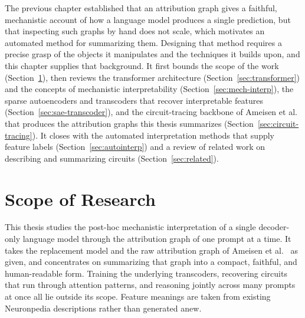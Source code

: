 \documentclass[../main.tex]{subfiles}
\begin{document}


The previous chapter established that an attribution graph gives a faithful, mechanistic account of how a language model produces a single prediction, but that inspecting such graphs by hand does not scale, which motivates an automated method for summarizing them. Designing that method requires a precise grasp of the objects it manipulates and the techniques it builds upon, and this chapter supplies that background. It first bounds the scope of the work (Section~\ref{sec:scope}), then reviews the transformer architecture (Section~\ref{sec:transformer}) and the concepts of mechanistic interpretability (Section~\ref{sec:mech-interp}), the sparse autoencoders and transcoders that recover interpretable features (Section~\ref{sec:sae-transcoder}), and the circuit-tracing backbone of Ameisen et al.~\cite{ameisen2025circuit} that produces the attribution graphs this thesis summarizes (Section~\ref{sec:circuit-tracing}). It closes with the automated interpretation methods that supply feature labels (Section~\ref{sec:autointerp}) and a review of related work on describing and summarizing circuits (Section~\ref{sec:related}).

\section{Scope of Research}
\label{sec:scope}
This thesis studies the post-hoc mechanistic interpretation of a single decoder-only language model through the attribution graph of one prompt at a time. It takes the replacement model and the raw attribution graph of Ameisen et al.~\cite{ameisen2025circuit} as given, and concentrates on summarizing that graph into a compact, faithful, and human-readable form. Training the underlying transcoders, recovering circuits that run through attention patterns, and reasoning jointly across many prompts at once all lie outside its scope. Feature meanings are taken from existing Neuronpedia descriptions rather than generated anew.
\end{document}
